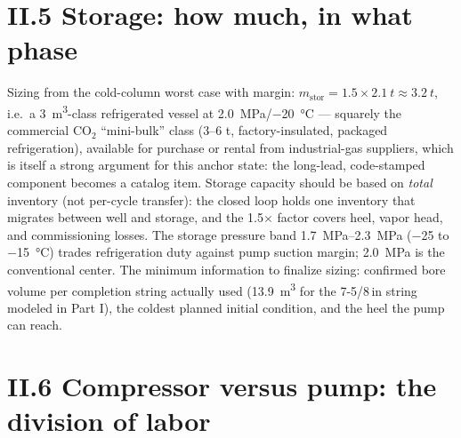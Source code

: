 \section{II.5 Storage: how much, in what phase}

Sizing from the cold-column worst case with margin:
$m_{\mathrm{stor}} = 1.5 \times \SI{2.1}{t} \approx \SI{3.2}{t}$,
i.e.\ a \SI{3}{m^3}-class refrigerated vessel at
\SI{2.0}{MPa}/\SI{-20}{\celsius} --- squarely the commercial CO$_2$
``mini-bulk'' class (3--6 t, factory-insulated, packaged
refrigeration), available for purchase or rental from industrial-gas
suppliers, which is itself a strong argument for this anchor state:
the long-lead, code-stamped component becomes a catalog item. Storage
capacity should be based on \emph{total} inventory (not per-cycle
transfer): the closed loop holds one inventory that migrates between
well and storage, and the 1.5$\times$ factor covers heel, vapor head,
and commissioning losses. The storage pressure band
\SIrange{1.7}{2.3}{MPa} (\SI{-25}{} to \SI{-15}{\celsius}) trades
refrigeration duty against pump suction margin; \SI{2.0}{MPa} is the
conventional center. The minimum information to finalize sizing:
confirmed bore volume per completion string actually used
(\SI{13.9}{m^3} for the 7-5/8\,in string modeled in Part I), the
coldest planned initial condition, and the heel the pump can reach.

\section{II.6 Compressor versus pump: the division of labor}

